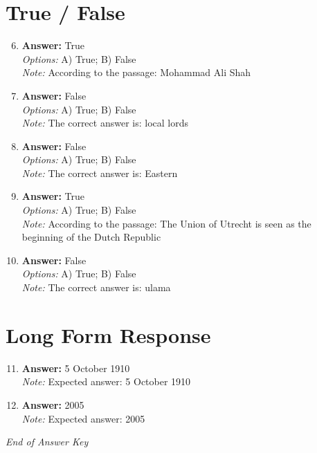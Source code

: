 \documentclass[12pt]{article}
\begin{document}
\section*{True / False}
\begin{enumerate}[label=\arabic*.]
\setcounter{enumi}{5}
\item \textbf{Answer:} True
\\ \textit{Options:} A) True; B) False
\\ \textit{Note:} According to the passage: Mohammad Ali Shah
\item \textbf{Answer:} False
\\ \textit{Options:} A) True; B) False
\\ \textit{Note:} The correct answer is: local lords
\item \textbf{Answer:} False
\\ \textit{Options:} A) True; B) False
\\ \textit{Note:} The correct answer is: Eastern
\item \textbf{Answer:} True
\\ \textit{Options:} A) True; B) False
\\ \textit{Note:} According to the passage: The Union of Utrecht is seen as the beginning of the Dutch Republic
\item \textbf{Answer:} False
\\ \textit{Options:} A) True; B) False
\\ \textit{Note:} The correct answer is: ulama
\end{enumerate}

\section*{Long Form Response}
\begin{enumerate}[label=\arabic*.]
\setcounter{enumi}{10}
\item \textbf{Answer:} 5 October 1910
\\ \textit{Note:} Expected answer: 5 October 1910
\item \textbf{Answer:} 2005
\\ \textit{Note:} Expected answer: 2005
\end{enumerate}

\vfill
\noindent\textit{End of Answer Key}
\end{document}
